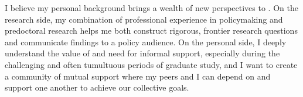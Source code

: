 %

I believe my personal background brings a wealth of new perspectives to \school. On the research side, my combination of professional experience in policymaking and predoctoral research helps me both construct rigorous, frontier research questions and communicate findings to a policy audience. On the personal side, I deeply understand the value of and need for informal support, especially during the challenging and often tumultuous periods of graduate study, and I want to create a community of mutual support where my peers and I can depend on and support one another to achieve our collective goals.
